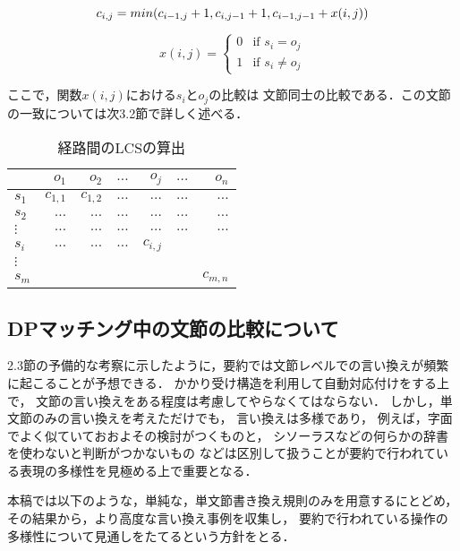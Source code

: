 \[
c_{i,j} = min( c_{i-1,j} + 1 , c_{i,j-1} + 1, c_{i-1,j-1} + x(i,j) )\\
\]

\[
x(i,j) = \left\{
	\begin{array}{rl}
	0 & \mbox{if $s_i = o_j$} \\
	1 & \mbox{if $s_i \neq o_j$}
	\end{array}
	\right.
\]

ここで，関数$x(i,j)$における$s_i$と$o_j$の比較は
文節同士の比較である．この文節の一致については次3.2節で詳しく述べる．

\begin{table}
\caption{経路間のLCSの算出} 
\label{dpm}
\begin{center}
\begin{tabular}{|l|r|r|r|r|r|r|}
\hline
        & $o_1$  & $o_2$ &$\dots$&$o_j$&$\dots$&$o_n$ \\ \hline \hline
$s_1$   &$c_{1,1}$ &$c_{1,2}$&$\dots$&$\dots$&$\dots$&$\dots$ \\
$s_2$   &$\dots$ &$\dots$&$\dots$&$\dots$&$\dots$&$\dots$ \\
$\vdots$ &$\dots$ &$\dots$&$\dots$&$\dots$&$\dots$&$\dots$ \\
$s_i$   &$\dots$ &$\dots$&$\dots$&$c_{i,j}$&       &\\
$\vdots$ &        &       &       &      &       &\\
$s_m$   &        &       &       &      &       &$c_{m,n}$\\
\hline
\end{tabular}
\end{center}
\end{table}
\vspace{-2pt}
\subsection{DPマッチング中の文節の比較について}

2.3節の予備的な考察に示したように，要約では文節レベルでの言い換えが頻繁に起こることが予想できる．
かかり受け構造を利用して自動対応付けをする上で，
文節の言い換えをある程度は考慮してやらなくてはならない．
しかし，単文節のみの言い換えを考えただけでも，
言い換えは多様であり，
例えば，字面でよく似ていておおよその検討がつくものと，
シソーラスなどの何らかの辞書を使わないと判断がつかないもの
などは区別して扱うことが要約で行われている表現の多様性を見極める上で重要となる．

本稿では以下のような，単純な，単文節書き換え規則のみを用意するにとどめ，その結果から，より高度な言い換え事例を収集し，
要約で行われている操作の多様性について見通しをたてるという方針をとる．

